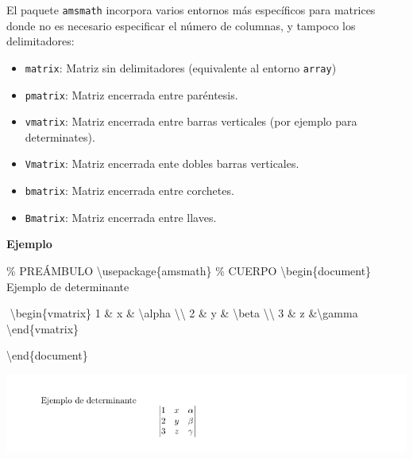 \documentclass[
  letterpaper,
  DIV=11,
  numbers=noendperiod]{scrreport}
\newenvironment{Shaded}{\begin{snugshade}}{\end{snugshade}}
\newcommand{\BuiltInTok}[1]{\textcolor[rgb]{0.00,0.23,0.31}{#1}}
\newcommand{\CommentTok}[1]{\textcolor[rgb]{0.37,0.37,0.37}{#1}}
\newcommand{\ExtensionTok}[1]{\textcolor[rgb]{0.00,0.23,0.31}{#1}}
\newcommand{\KeywordTok}[1]{\textcolor[rgb]{0.00,0.23,0.31}{#1}}
\newcommand{\NormalTok}[1]{\textcolor[rgb]{0.00,0.23,0.31}{#1}}
\newcommand{\SpecialCharTok}[1]{\textcolor[rgb]{0.37,0.37,0.37}{#1}}
\newcommand{\SpecialStringTok}[1]{\textcolor[rgb]{0.13,0.47,0.30}{#1}}
\providecommand{\tightlist}{%
  \setlength{\itemsep}{0pt}\setlength{\parskip}{0pt}}\usepackage{longtable,booktabs,array}
\begin{document}
El paquete \texttt{amsmath} incorpora varios entornos más específicos
para matrices donde no es necesario especificar el número de columnas, y
tampoco los delimitadores:

\begin{itemize}
\tightlist
\item
  \texttt{matrix}: Matriz sin delimitadores (equivalente al entorno
  \texttt{array})
\item
  \texttt{pmatrix}: Matriz encerrada entre paréntesis.
\item
  \texttt{vmatrix}: Matriz encerrada entre barras verticales (por
  ejemplo para determinates).
\item
  \texttt{Vmatrix}: Matriz encerrada ente dobles barras verticales.
\item
  \texttt{bmatrix}: Matriz encerrada entre corchetes.
\item
  \texttt{Bmatrix}: Matriz encerrada entre llaves.
\end{itemize}

\textbf{Ejemplo}

\begin{Shaded}
\begin{Highlighting}[]
\CommentTok{\% PREÁMBULO}
\BuiltInTok{\textbackslash{}usepackage}\NormalTok{\{}\ExtensionTok{amsmath}\NormalTok{\}}
\CommentTok{\% CUERPO}
\KeywordTok{\textbackslash{}begin}\NormalTok{\{}\ExtensionTok{document}\NormalTok{\}}
\NormalTok{Ejemplo de determinante}

\SpecialStringTok{$$}
\KeywordTok{\textbackslash{}begin}\NormalTok{\{}\ExtensionTok{vmatrix}\NormalTok{\}}
\SpecialStringTok{1 \& x \& }\SpecialCharTok{\textbackslash{}alpha}\SpecialStringTok{ }\SpecialCharTok{\textbackslash{}\textbackslash{}}
\SpecialStringTok{2 \& y \& }\SpecialCharTok{\textbackslash{}beta}\SpecialStringTok{ }\SpecialCharTok{\textbackslash{}\textbackslash{}}
\SpecialStringTok{3 \& z \&}\SpecialCharTok{\textbackslash{}gamma}
\KeywordTok{\textbackslash{}end}\NormalTok{\{}\ExtensionTok{vmatrix}\NormalTok{\}}
\SpecialStringTok{$$}



\KeywordTok{\textbackslash{}end}\NormalTok{\{}\ExtensionTok{document}\NormalTok{\}}
\end{Highlighting}
\end{Shaded}

\begin{tcolorbox}[enhanced jigsaw, opacitybacktitle=0.6, coltitle=black, colbacktitle=quarto-callout-note-color!10!white, title={Salida}, colback=white, toprule=.15mm, breakable, opacityback=0, left=2mm, rightrule=.15mm, toptitle=1mm, colframe=quarto-callout-note-color-frame, bottomtitle=1mm, titlerule=0mm, arc=.35mm, bottomrule=.15mm, leftrule=.75mm]
\includegraphics{./img/formulas/determinante.png}
\end{tcolorbox}
\end{document}
